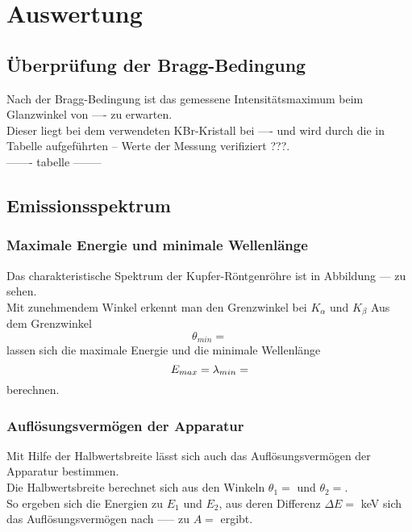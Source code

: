 \section{Auswertung}
\label{sec:Auswertung}



\subsection{Überprüfung der Bragg-Bedingung}
\label{subsec:bragg}
Nach der Bragg-Bedingung ist das gemessene Intensitätsmaximum beim Glanzwinkel von ---- zu erwarten. \\
Dieser liegt bei dem verwendeten KBr-Kristall bei ---- und wird durch die in Tabelle aufgeführten -- Werte der Messung 
verifiziert ???. \\

------- tabelle --------



\subsection{Emissionsspektrum}
\label{subsec:emissionsspektrum}


\subsubsection*{Maximale Energie und minimale Wellenlänge}

Das charakteristische Spektrum der Kupfer-Röntgenröhre ist in Abbildung --- zu sehen.\\
Mit zunehmendem Winkel erkennt man den Grenzwinkel bei  $K_{\alpha}$ und $K_{\beta}$ 
Aus dem Grenzwinkel \begin{equation*}
  \theta_{min} = 
\end{equation*}
lassen sich die maximale Energie und die minimale Wellenlänge \begin{equation*}
  E_{max} = \\\\
  \lambda_{min} =
\end{equation*} 
berechnen.


\subsubsection*{Auflösungsvermögen der Apparatur}

Mit Hilfe der Halbwertsbreite lässt sich auch das Auflösungsvermögen der Apparatur bestimmen. \\
Die Halbwertsbreite berechnet sich aus den Winkeln $\theta_1 = $ und $\theta_2 = $.\\
So ergeben sich die Energien zu $E_1$ und $E_2$, aus deren Differenz $\Delta E = $ keV sich das Auflösungsvermögen
nach ----- zu $A = $ ergibt.



